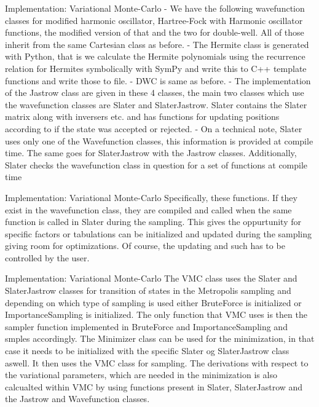 \documentclass[10pt]{beamer}
\begin{document}
\begin{frame}[fragile]{Implementation: Variational Monte-Carlo}
    - We have the following wavefunction classes for modified harmonic
    oscillator, Hartree-Fock with Harmonic oscillator functions, the modified
    version of that and the two for double-well. All of those inherit from the
    same Cartesian class as before.
    - The Hermite class is generated with Python, that is we calculate the
    Hermite polynomials using the recurrence relation for Hermites symbolically
    with SymPy and write this to C++ template functions and write those to
    file.
    - DWC is same as before.
    - The implementation of the Jastrow class are given in these 4 classes, the
    main two classes which use the wavefunction classes are Slater and
    SlaterJastrow. Slater contains the Slater matrix along with inversers etc.
    and has functions for updating positions according to if the state was
    accepted or rejected.
    - On a technical note, Slater uses only one of the Wavefunction classes,
    this information is provided at compile time. The same goes for
    SlaterJastrow with the Jastrow classes. Additionally, Slater checks the
    wavefunction class in question for a set of functions at compile time
\end{frame}

\begin{frame}[fragile]{Implementation: Variational Monte-Carlo}
    Specifically, these functions. If they exist in the wavefunction class,
    they are compiled and called when the same function is called in Slater
    during the sampling. This gives the oppurtunity for specific factors or
    tabulations can be initialized and updated during the sampling giving room
    for optimizations. Of course, the updating and such has to be controlled by
    the user.
\end{frame}

\begin{frame}[fragile]{Implementation: Variational Monte-Carlo}
    The VMC class uses the Slater and SlaterJastrow classes for transition of
    states in the Metropolis sampling and depending on which type of sampling
    is used either BruteForce is initialized or ImportanceSampling is
    initialized. The only function that VMC uses is then the sampler function
    implemented in BruteForce and ImportanceSampling and smples accordingly.
    The Minimizer class can be used for the minimization, in that case it needs
    to be initialized with the specific Slater og SlaterJastrow class aswell.
    It then uses the VMC class for sampling. The derivations with respect to
    the variational parameters, which are needed in the minimization is also
    calcualted within VMC by using functions present in Slater, SlaterJastrow
    and the Jastrow and Wavefunction classes.
\end{frame}
\end{document}
